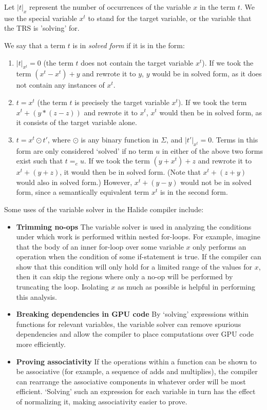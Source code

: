 Let $|t|_x$ represent the number of occurrences of the variable $x$ in the term $t$. We use the special variable $x^t$ to stand for the target variable, or the variable that the TRS is 'solving' for.

We say that a term $t$ is in \emph{solved form} if it is in the form:
\begin{enumerate}
  \item $|t|_{x^t} = 0$ (the term $t$ does not contain the target variable $x^t$). If we took the term $(x^t - x^t) + y$ and rewrote it to $y$, $y$ would be in solved form, as it does not contain any instances of $x^t$.
  \item $t = x^t$ (the term $t$ is precisely the target variable $x^t$). If we took the term $x^t + (y * (z - z))$ and rewrote it to $x^t$, $x^t$ would then be in solved form, as it consists of the target variable alone.
  \item $t = x^t \odot t'$, where $\odot$ is any binary function in $\Sigma$, and $|t'|_{x^t} = 0$. Terms in this form are only considered `solved' if no term $u$ in either of the above two forms exist such that $t =_e u$. If we took the term $(y + x^t) + z$ and rewrote it to $x^t + (y + z)$, it would then be in solved form. (Note that $x^t + (z + y)$ would also in solved form.) However, $x^t + (y - y)$ would not be in solved form, since a semantically equivalent term $x^t$ is in the second form.
\end{enumerate}

Some uses of the variable solver in the Halide compiler include:

\begin{itemize}
	\item \textbf{Trimming no-ops} The variable solver is used in analyzing the conditions under which work is performed within nested for-loops. For example, imagine that the body of an inner for-loop over some variable $x$ only performs an operation when the condition of some if-statement is true. If the compiler can show that this condition will only hold for a limited range of the values for $x$, then it can skip the regions where only a no-op will be performed by truncating the loop. Isolating $x$ as much as possible is helpful in performing this analysis.
	\item \textbf{Breaking dependencies in GPU code} By `solving' expressions within functions for relevant variables, the variable solver can remove spurious dependencies and allow the compiler to place computations over GPU code more efficiently.
	\item \textbf{Proving associativity} If the operations within a function can be shown to be associative (for example, a sequence of adds and multiplies), the compiler can rearrange the associative components in whatever order will be most efficient. `Solving' such an expression for each variable in turn has the effect of normalizing it, making associativity easier to prove.
\end{itemize}


